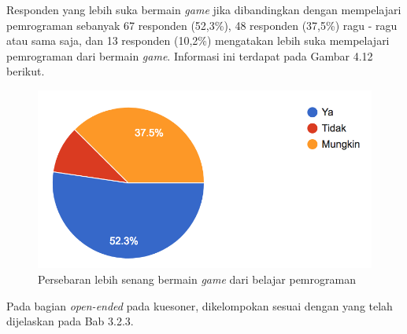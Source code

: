 	Responden yang lebih suka bermain \textit{game} jika dibandingkan dengan mempelajari pemrograman sebanyak 67 responden (52,3\%), 48 responden (37,5\%) ragu - ragu atau sama saja, dan 13 responden (10,2\%) mengatakan lebih suka mempelajari pemrograman dari bermain \textit{game}. Informasi ini terdapat pada Gambar 4.12 berikut.
	\begin{figure}
		\includegraphics[width=\linewidth]{pics/lebih-senang-bermain-game}
		\caption{Persebaran lebih senang bermain \textit{game} dari belajar pemrograman}
		\centering
	\end{figure}
%
Pada bagian \textit{open-ended} pada kuesoner, dikelompokan sesuai dengan yang telah dijelaskan pada Bab 3.2.3.
